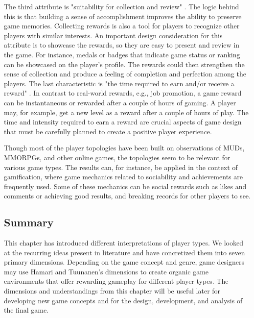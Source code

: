 The third attribute is "suitability for collection and review" \citep{wang_game_2011}. The logic behind this is that building a sense of accomplishment improves the ability to preserve game memories. Collecting rewards is also a tool for players to recognize other players with similar interests. An important design consideration for this attribute is to showcase the rewards, so they are easy to present and review in the game. For instance, medals or badges that indicate game status or ranking can be showcased on the player’s profile. The rewards could then strengthen the sense of collection and produce a feeling of completion and perfection among the players.
The last characteristic is "the time required to earn and/or receive a reward" \citep{wang_game_2011}. In contrast to real-world rewards, e.g., job promotion, a game reward can be instantaneous or rewarded after a couple of hours of gaming. A player may, for example, get a new level as a reward after a couple of hours of play. The time and intensity required to earn a reward are crucial aspects of game design that must be carefully planned to create a positive player experience.

Though most of the player topologies have been built on observations of MUDs, MMORPGs, and other online games, the topologies seem to be relevant for various game types. The results can, for instance, be applied in the context of gamification, where game mechanics related to sociability and achievements are frequently used. Some of these mechanics can be social rewards such as likes and comments or achieving good results, and breaking records for other players to see.

\subsection{Summary}
This chapter has introduced different interpretations of player types. We looked at the recurring ideas present in literature and have concretized them into seven primary dimensions. Depending on the game concept and genre, game designers may use Hamari and Tuunanen’s dimensions to create organic game environments that offer rewarding gameplay for different player types. The dimensions and understandings from this chapter will be useful later for developing new game concepts and for the design, development, and analysis of the final game.